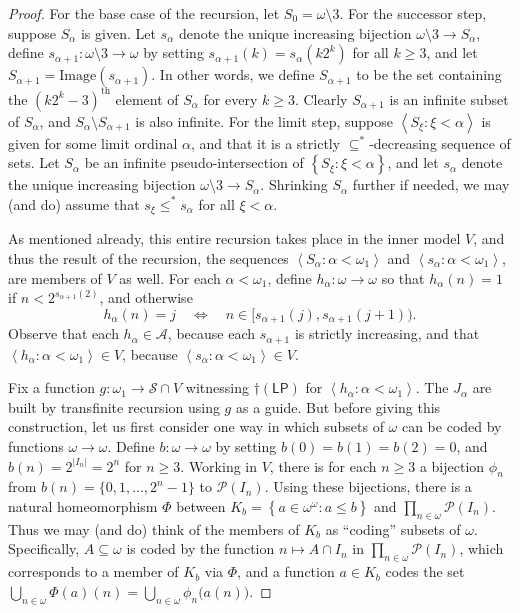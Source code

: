 \documentclass[10pt,a4paper]{amsart}
\newcommand{\A}{\mathcal{A}}
\renewcommand{\P}{\mathcal{P}}
\renewcommand{\a}{\alpha}
\newcommand{\brackets}[1]{\left\langle #1 \right\rangle}
\newcommand{\cLP}{\dagger(\mathsf{LP})}
\newcommand{\explicitSet}[1]{\left\lbrace #1 \right\rbrace}
\newcommand{\seq}[2]{\brackets{#1 \colon #2}}
\newcommand{\set}[2]{\explicitSet{#1 \colon #2}}
\newcommand{\sub}{\subseteq}
\newcommand{\w}{\omega}
\begin{document}
\begin{proof}
For the base case of the recursion, let $S_0 = \w \setminus 3$. 
For the successor step, suppose $S_\a$ is given. 
Let $s_\a$ denote the unique increasing bijection $\w \setminus 3 \to S_\a$, define $s_{\a+1}: \w \setminus 3 \to \w$ by setting $s_{\a+1}(k) = s_\a(k2^k)$ for all $k \geq 3$, and let $S_{\a+1} = \mathrm{Image}(s_{\a+1})$. 
In other words, we define $S_{\a+1}$ to be the set containing the $(k2^k - 3)^\mathrm{th}$ element of $S_\a$ for every $k \geq 3$. Clearly $S_{\a+1}$ is an infinite subset of $S_\a$, and $S_\a \setminus S_{\a+1}$ is also infinite. 
For the limit step, suppose $\seq{S_\xi}{\xi < \a}$ is given for some limit ordinal $\a$, and that it is a strictly $\sub^*$-decreasing sequence of sets. 
Let $S_\a$ be an infinite pseudo-intersection of $\set{S_\xi}{\xi < \a}$, and let $s_\a$ denote the unique increasing bijection $\w \setminus 3 \to S_\a$. Shrinking $S_\a$ further if needed, we may (and do) assume that $s_\xi \leq^* s_\a$ for all $\xi < \a$. 

As mentioned already, this entire recursion takes place in the inner model $V$, and thus the result of the recursion, the sequences $\seq{S_\a}{\a < \w_1}$ and $\seq{s_\a}{\a < \w_1}$, are members of $V$ as well. 
For each $\a < \w_1$, define $h_\a: \w \to \w$ so that $h_\a(n) = 1$ if $n < 2^{s_{\a+1}(2)}$, and otherwise  
$$h_\a(n) = j \quad \Leftrightarrow \quad n \in \big[ s_{\a+1}(j),s_{\a+1}(j+1) \big).$$
Observe that each $h_\a \in \A$, because each $s_{\a+1}$ is strictly increasing, and that $\seq{h_\a}{\a < \w_1} \in V$, because $\seq{s_\a}{\a < \w_1} \in V$. 

Fix a function $g: \w_1 \to \mathcal S \cap V$ witnessing $\cLP$ for $\seq{h_\a}{\a < \w_1}$. 
The $J_\a$ are built by transfinite recursion using $g$ as a guide. 
But before giving this construction, let us first consider one way in which subsets of $\w$ can be coded by functions $\w \to \w$. 
Define $b: \w \to \w$ by setting $b(0)=b(1)=b(2)=0$, and $b(n) = 2^{|I_n|} = 2^n$ for $n \geq 3$. 
Working in $V$, there is for each $n \geq 3$ a bijection $\phi_n$ from $b(n) = \{0,1,\dots,2^n-1\}$ to $\P(I_n)$. 
Using these bijections, there is a natural homeomorphism $\Phi$ between 
$K_b = \set{a \in \w^\w}{a \leq b}$ and $\prod_{n \in \w}\P(I_n)$. 
Thus we may (and do) think of the members of $K_b$ as ``coding'' subsets of $\w$. Specifically, $A \sub \w$ is coded by the function $n \mapsto A \cap I_n$ in $\prod_{n \in \w}\P(I_n)$, which corresponds to a member of $K_b$ via $\Phi$, and a function $a \in K_b$ codes the set $\bigcup_{n \in \w}\Phi(a)(n) = \bigcup_{n \in \w}\phi_n\big(a(n)\big)$. 


\end{proof}
\end{document}
